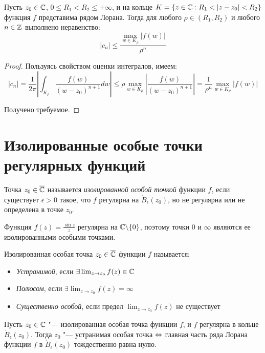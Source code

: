 \begin{proposition}
	Пусть $z_0 \in \mathbb{C}$, $0 \le R_1 < R_2 \le +\infty$, и на кольце $K = \{z \in \mathbb{C}: R_1 < |z - z_0| < R_2\}$ функция $f$ представима рядом Лорана. Тогда для любого $\rho \in (R_1, R_2)$ и любого $n \in \mathbb{Z}$ выполнено неравенство:
	\[|c_n| \le \frac{\max_{w \in K_{\rho}}\left|{f(w)}\right|}{\rho^n}\]
\end{proposition}

\begin{proof}
	Пользуясь свойством оценки интегралов, имеем:
	\[|c_n| = \frac1{2\pi}\left|\int_{K_{\rho}} \frac{f(w)}{(w - z_0)^{n+1}}dw\right| \le \rho\max_{w \in K_\rho}\left|\frac{f(w)}{(w - z_0)^{n+1}}\right| = \frac1{\rho^n}\max_{w \in K_{\rho}}\left|{f(w)}\right|\]
	
	Получено требуемое.
\end{proof}

\section{Изолированные особые точки регулярных функций}

\begin{definition}
	Точка $z_0 \in \overline{\mathbb{C}}$ называется \textit{изолированной особой точкой} функции $f$, если существует $\epsilon > 0$ такое, что $f$ регулярна на $\mathring B_\epsilon(z_0)$, но не регулярна или не определена в точке $z_0$.
\end{definition}

\begin{example}
	Функция $f(z) = \frac{\sin{z}}{z}$ регулярна на $\mathbb{C} \backslash \{0\}$, поэтому точки $0$ и $\infty$ являются ее изолированными особыми точками.
\end{example}

\begin{definition}
	Изолированная особая точка $z_0 \in \overline{\mathbb{C}}$ функции $f$ называется:
	\begin{itemize}
		\item \textit{Устранимой}, если $\exists \lim_{z \to z_0} f(z) \in \mathbb{C}$
		\item \textit{Полюсом}, если $\exists \lim_{z \to z_0} f(z) = \infty$
		\item \textit{Существенно особой}, если предел $\lim_{z \to z_0} f(z)$ не существует
	\end{itemize}
\end{definition}

\begin{proposition}
	Пусть $z_0 \in \mathbb{C}$ "--- изолированная особая точка функции $f$, и $f$ регулярна в кольце $\mathring B_\epsilon(z_0)$. Тогда $z_0$ "--- устранимая особая точка $\Leftrightarrow$ главная часть ряда Лорана функции $f$ в $\mathring B_\epsilon(z_0)$ тождественно равна нулю.
\end{proposition}

